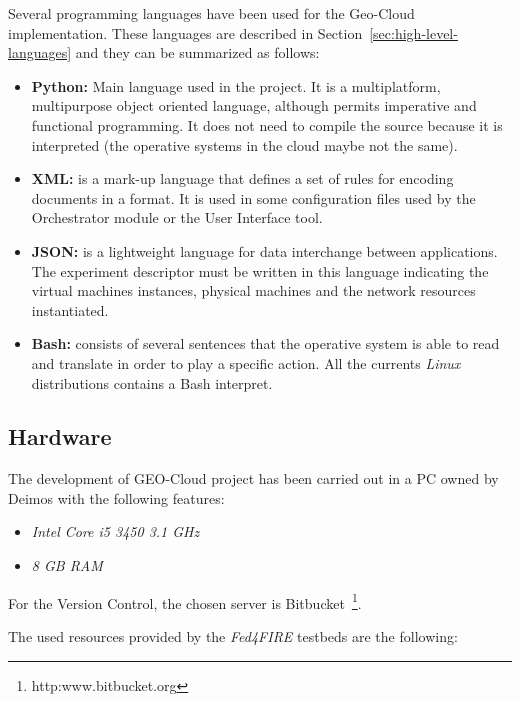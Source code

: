 Several programming languages have been used for the Geo-Cloud
implementation. These languages are described in Section~\ref{sec:high-level-languages} and they can be
summarized as follows:

\begin{itemize}
\item \textbf{Python:}  Main language used in the project. It is a
  multiplatform, multipurpose object oriented language, although permits imperative and functional
programming. It does not need to compile the source because it is
interpreted (the operative systems in the cloud maybe not the same).
 \item \textbf{\ac{XML}:} is a mark-up language that defines a set of rules for encoding
documents in a format. It is used in some configuration files used by the
   Orchestrator module or the User Interface tool.

\item \textbf{\ac{JSON}:} is a lightweight language for data interchange between
  applications. The \bonfire experiment descriptor must be written in this
  language indicating the virtual machines instances, physical machines and the
  network resources instantiated.

\item \textbf{Bash:}  consists of several sentences that the operative system is
able to read and translate in order to play a specific action. All the currents
\emph{Linux} distributions contains a Bash interpret. 

\end{itemize}


\subsection{Hardware}

The development of GEO-Cloud project has been carried out in a PC owned by
Deimos with the following features:
\begin{itemize}
\item \emph{Intel Core i5 3450 3.1 GHz}
\item \emph{8 GB RAM}
\end{itemize}

For the Version Control, the chosen server is
Bitbucket~\footnote{http:www.bitbucket.org}.

The used resources provided  by the \emph{Fed4FIRE} testbeds are the following:

